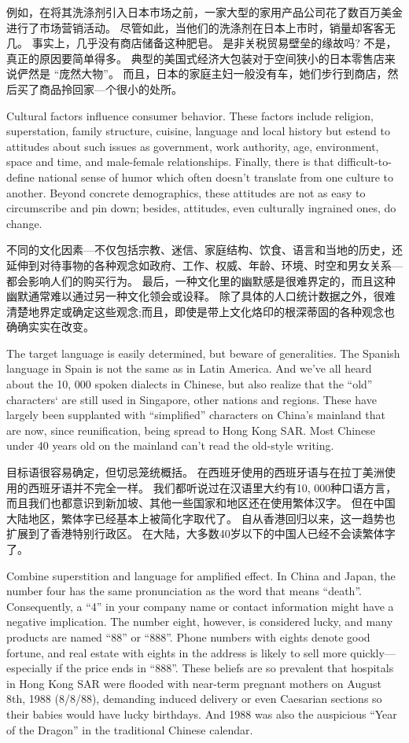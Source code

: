 \documentclass[cs4size, a4paper, 12pt]{article}
\newcounter{numpar}
\newcommand*{\newpar}{\numpar{}}
\begin{document}
	例如，在将其洗涤剂引入日本市场之前，一家大型的家用产品公司花了数百万美金进行了市场营销活动。 尽管如此，当他们的洗涤剂在日本上市时，销量却客客无几。 事实上，几乎没有商店储备这种肥皂。 是非关税贸易壁垒的缘故吗? 不是，真正的原因要简单得多。 典型的美国式经济大包装对于空间狭小的日本零售店来说俨然是 ``庞然大物''。 而且，日本的家庭主妇一般没有车，她们步行到商店，然后买了商品拎回家—个很小的处所。  
	
	\newpar Cultural factors influence consumer behavior. These factors include religion, superstation, family structure, cuisine, language and local history but estend to attitudes about such issues as government, work authority, age, environment, space and time, and male-female relationships. Finally, there is that difficult-to-define national sense of humor which often doesn't translate from one culture to another. Beyond concrete demographics, these attitudes are not as easy to circumscribe and pin down; besides, attitudes, even culturally ingrained ones, do change.
	
	不同的文化因素—不仅包括宗教、迷信、家庭结构、饮食、语言和当地的历史，还延伸到对待事物的各种观念如政府、工作、权威、年龄、环境、时空和男女关系—都会影响人们的购买行为。 最后，一种文化里的幽默感是很难界定的，而且这种幽默通常难以通过另一种文化领会或设释。 除了具体的人口统计数据之外，很难清楚地界定或确定这些观念;而且，即使是带上文化烙印的根深蒂固的各种观念也确确实实在改变。  
	
	\newpar The target language is easily determined, but beware of generalities. The Spanish language in Spain is not the same as in Latin America. And we've all heard about the 10, 000  spoken dialects in Chinese, but also realize that the ``old'' characters` are still used in Singapore, other nations and regions. These have largely been supplanted with ``simplified'' characters on China's mainland that are now, since reunification, being spread to Hong Kong SAR. Most Chinese under 40 years old on the mainland can't read the old-style writing.
	
	目标语很容易确定，但切忌笼统概括。 在西班牙使用的西班牙语与在拉丁美洲使用的西班牙语并不完全一样。 我们都听说过在汉语里大约有10, 000种口语方言，而且我们也都意识到新加坡、其他一些国家和地区还在使用繁体汉字。 但在中国大陆地区，繁体字已经基本上被简化字取代了。 自从香港回归以来，这一趋势也扩展到了香港特别行政区。 在大陆，大多数40岁以下的中国人已经不会读繁体字了。  
	
	\newpar Combine superstition and language for amplified effect. In China and Japan, the number four has the same pronunciation as the word that means ``death''. Consequently, a ``4'' in your company name or contact information might have a negative implication. The number eight, however, is considered lucky, and many products are named ``88'' or ``888''. Phone numbers with eights denote good fortune, and real estate with eights in the address is likely to sell more quickly—especially if the price ends in ``888''. These beliefs are so prevalent that hospitals in Hong Kong SAR were flooded with near-term pregnant mothers on August 8th, 1988 (8/8/88), demanding induced delivery or even Caesarian sections so their babies would have lucky birthdays. And 1988 was also the auspicious ``Year of the Dragon'' in the traditional Chinese calendar.
	
\end{document}
